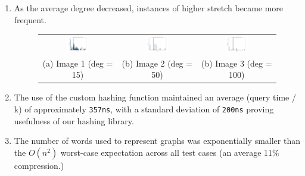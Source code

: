 \documentclass{article}
\begin{document}
\begin{enumerate}
    \item As the average degree decreased, instances of higher stretch became more frequent.
    
    \begin{figure}[H]
        \centering
        \begin{tabular}{ccc}
            \includegraphics[width=0.3\textwidth]{img/test19.png} &
            \includegraphics[width=0.3\textwidth]{img/test20.png} &
            \includegraphics[width=0.3\textwidth]{img/test21.png}\\
            (a) Image 1 (deg = 15) & (b) Image 2 (deg = 50) & (b) Image 3 (deg = 100) \\
        \end{tabular}
        \label{fig:555}
    \end{figure}

    \item The use of the custom hashing function maintained an average (query time / k) of approximately \texttt{357ns}, with a standard deviation of \texttt{200ns} proving usefulness of our hashing library.

    \item The number of words used to represent graphs was exponentially smaller than the $O(n^2)$ worst-case expectation across all test cases (an average 11\% compression.)
    
\end{enumerate}
\end{document}
